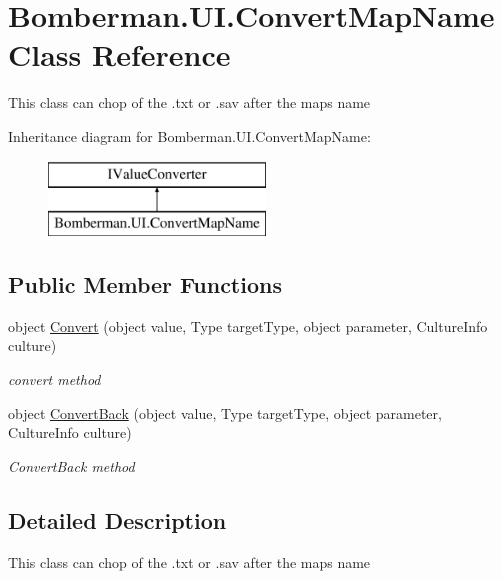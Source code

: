 \hypertarget{class_bomberman_1_1_u_i_1_1_convert_map_name}{}\section{Bomberman.\+U\+I.\+Convert\+Map\+Name Class Reference}
\label{class_bomberman_1_1_u_i_1_1_convert_map_name}


This class can chop of the .txt or .sav after the maps name  


Inheritance diagram for Bomberman.\+U\+I.\+Convert\+Map\+Name\+:\begin{figure}[H]
\begin{center}
\leavevmode
\includegraphics[height=2.000000cm]{class_bomberman_1_1_u_i_1_1_convert_map_name}
\end{center}
\end{figure}
\subsection*{Public Member Functions}
\begin{DoxyCompactItemize}
\item 
object \mbox{\hyperlink{class_bomberman_1_1_u_i_1_1_convert_map_name_a0c1d69d6e5ed927deb737b951e753d1e}{Convert}} (object value, Type target\+Type, object parameter, Culture\+Info culture)
\begin{DoxyCompactList}\small\item\em convert method \end{DoxyCompactList}\item 
object \mbox{\hyperlink{class_bomberman_1_1_u_i_1_1_convert_map_name_adccc6de5bf6194f05a8bb782cb7c4e88}{Convert\+Back}} (object value, Type target\+Type, object parameter, Culture\+Info culture)
\begin{DoxyCompactList}\small\item\em Convert\+Back method \end{DoxyCompactList}\end{DoxyCompactItemize}


\subsection{Detailed Description}
This class can chop of the .txt or .sav after the maps name 



